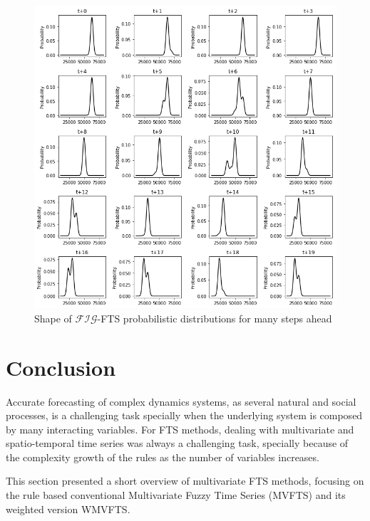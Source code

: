 \begin{figure}[htb]
    \centering
    \includegraphics[width=\textwidth]{figures/figfts_probabilistic_manystep_tiled.png}
    \caption{Shape of $\mathcal{FIG}$-FTS probabilistic distributions for many steps ahead}
    \label{fig:figfts_probabilistic_manystep_tiled}
\end{figure}

\section{Conclusion}
\label{sec:multivariate_conclusion}

Accurate forecasting of complex dynamics systems, as several natural and social processes, is a challenging task specially when the underlying system is composed by many interacting variables. For FTS methods, dealing with multivariate and spatio-temporal time series was always a challenging task, specially because of the complexity growth of the rules as the number of variables increases.

This section presented a short overview of multivariate FTS methods, focusing on the rule based conventional Multivariate Fuzzy Time Series (MVFTS) and its weighted version WMVFTS. 

